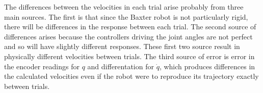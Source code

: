 \documentclass{../lab}
\begin{document}
\begin{task}
The differences between the velocities in each trial arise probably from three main sources. The first is that since the Baxter robot is not particularly rigid, there will be differences in the response between each trial. The second source of differences arises because the controllers driving the joint angles are not perfect and so will have slightly different responses. These first two source result in physically different velocities between trials. The third source of error is error in the encoder readings for $q$ and differentation for $\dot{q}$, which produces differences in the calculated velocities even if the robot were to reproduce its trajectory exactly between trials.

\end{task}
\end{document}
